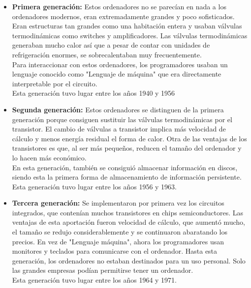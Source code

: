 \documentclass[titlepage, 12pt, a4paper]{article}
\begin{document}
\begin{itemize}
	\item{\textbf{Primera generación: }}Estos ordenadores no se parecían en nada a los ordenadores modernos, eran extremadamente grandes y poco sofisticados. Eran estructuras tan grandes como una habitación entera y usaban válvulas termodinámicas como switches y amplificadores. Las válvulas termodinámicas generaban mucho calor así que a pesar de contar con unidades de refrigeración enormes, se sobrecalentaban muy frecuentemente.\\Para interaccionar con estos ordenadores, los programadores usaban un lenguaje conocido como "Lenguaje de máquina" que era directamente interpretable por el circuito.\\Esta generación tuvo lugar entre los años 1940 y 1956
	\item{\textbf{Segunda generación: }}Estos ordenadores se distinguen de la primera generación porque consiguen sustituir las válvulas termodinámicas por el  transistor. El cambio de válvulas a transistor implica más velocidad de cálculo y menos energía residual el forma de calor. Otra de las ventajas de los transistores es que, al ser más pequeños, reducen el tamaño del ordenador y lo hacen más económico.\\En esta generación, también se consiguió almacenar información en discos, siendo esta la primera forma de almacenamiento de información persistente.\\Esta generación tuvo lugar entre los años 1956 y 1963.
	\item{\textbf{Tercera generación: }}Se implementaron por primera vez los circuitos integrados, que contenían muchos transistores en chips semiconductores. Las ventajas de esta aportación fueron velocidad de cálculo, que aumentó mucho, el tamaño se redujo considerablemente y se continuaron abaratando los precios. En vez de "Lenguaje máquina", ahora los programadores usan monitores y teclados para comunicarse con el ordenador. Hasta esta generación, los ordenadores no estaban destinados para un uso personal. Solo las grandes empresas podían permitirse tener un ordenador.\\Esta generación tuvo lugar entre los años 1964 y 1971.

\end{itemize}
\end{document}
